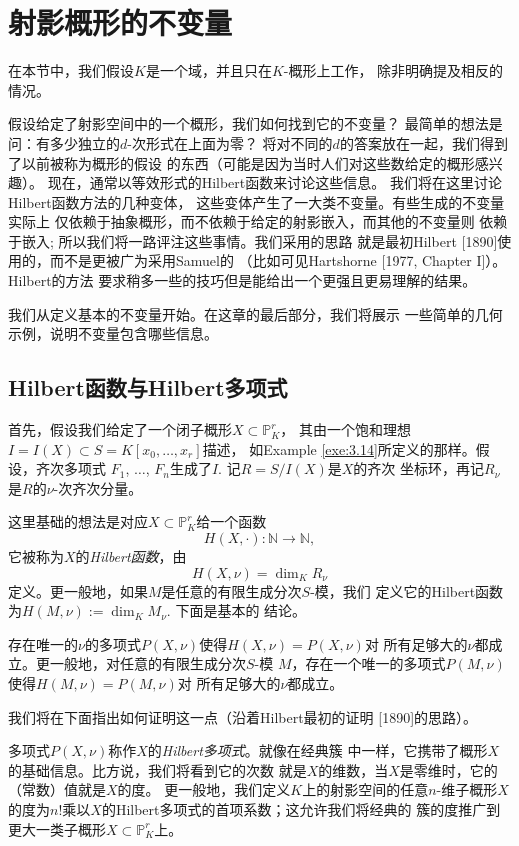 \section{射影概形的不变量}\label{s:3.3}

在本节中，我们假设$K$是一个域，并且只在$K$-概形上工作，
除非明确提及相反的情况。

假设给定了射影空间中的一个概形，我们如何找到它的不变量？
最简单的想法是问：有多少独立的$d$-次形式在上面为零？
将对不同的$d$的答案放在一起，我们得到了以前被称为概形的假设
的东西（可能是因为当时人们对这些数给定的概形感兴趣）。 
现在，通常以等效形式的Hilbert函数来讨论这些信息。
我们将在这里讨论Hilbert函数方法的几种变体，
这些变体产生了一大类不变量。有些生成的不变量实际上
仅依赖于抽象概形，而不依赖于给定的射影嵌入，而其他的不变量则
依赖于嵌入; 所以我们将一路评注这些事情。我们采用的思路 %
就是最初Hilbert [1890]使用的，而不是更被广为采用Samuel的
（比如可见Hartshorne [1977, Chapter I]）。 Hilbert的方法
要求稍多一些的技巧但是能给出一个更强且更易理解的结果。

我们从定义基本的不变量开始。在这章的最后部分，我们将展示
一些简单的几何示例，说明不变量包含哪些信息。

\subsection{Hilbert函数与Hilbert多项式}\label{s:3.3.1}

首先，假设我们给定了一个闭子概形$X\subset \mathbb P^r_K$，
其由一个饱和理想$I=I(X)\subset S=K[x_0,\dots,x_r]$描述，
如Example \ref{exe:3.14}所定义的那样。假设，齐次多项式
$F_1$, $\dots$, $F_n$生成了$I$. 记$R=S/I(X)$是$X$的齐次
坐标环，再记$R_\nu$是$R$的$\nu$-次齐次分量。

这里基础的想法是对应$X\subset \mathbb P^r_K$给一个函数
\[
	H(X,\cdot):\mathbb N\to \mathbb N,
\]
它被称为$X$的\textit{Hilbert函数}，由
\[
	H(X,\nu)=\dim_K R_\nu
\]
定义。更一般地，如果$M$是任意的有限生成分次$S$-模，我们
定义它的Hilbert函数为$H(M,\nu):=\dim_K M_\nu$. 下面是基本的
结论。

\begin{thm}[Hilbert]\label{thm:3.55}
存在唯一的$\nu$的多项式$P(X,\nu)$使得$H(X,\nu)=P(X,\nu)$对
所有足够大的$\nu$都成立。更一般地，对任意的有限生成分次$S$-模
$M$，存在一个唯一的多项式$P(M,\nu)$使得$H(M,\nu)=P(M,\nu)$对
所有足够大的$\nu$都成立。
\end{thm}

我们将在下面指出如何证明这一点（沿着Hilbert最初的证明
[1890]的思路）。

多项式$P(X,\nu)$称作$X$的\textit{Hilbert多项式}。就像在经典簇
中一样，它携带了概形$X$的基础信息。比方说，我们将看到它的次数
就是$X$的维数，当$X$是零维时，它的（常数）值就是$X$的度。
更一般地，我们定义$K$上的射影空间的任意$n$-维子概形$X$
的度为$n!$乘以$X$的Hilbert多项式的首项系数；这允许我们将经典的
簇的度推广到更大一类子概形$X\subset \mathbb P^r_K$上。

